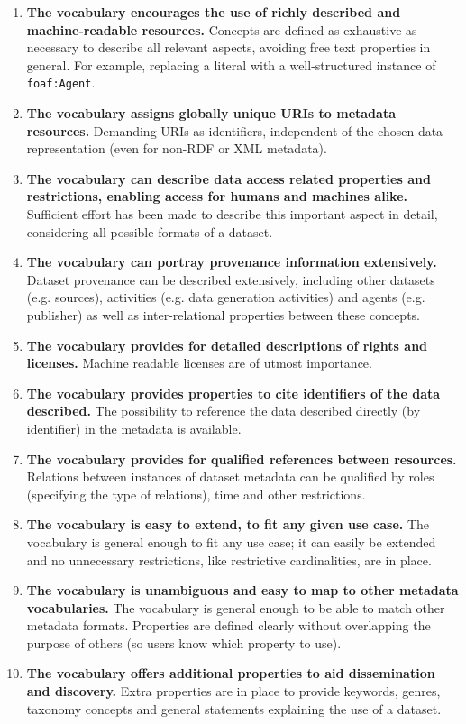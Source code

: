 \documentclass[a4paper,english,twoside,BCOR1.5cm,headsepline,DIV12,appendixprefix,final,12pt]{scrbook}
\newcommand{\prop}[1]{{{\texttt{#1}}}}
\begin{document}
\begin{enumerate}[A]
\item \textbf{The vocabulary encourages the use of richly described and machine-readable resources.} 
Concepts are defined as exhaustive as necessary to describe all relevant aspects, avoiding free text properties in general. For example, replacing a literal with a well-structured instance of \prop{foaf:Agent}. 
\item \textbf{The vocabulary assigns globally unique URIs to metadata resources.} Demanding URIs as identifiers, independent of the chosen data representation (even for non-RDF or XML metadata).
\item \textbf{The vocabulary can describe data access related properties and restrictions, enabling access for humans and machines alike.} Sufficient effort has been made to describe this important aspect in detail, considering all possible formats of a dataset.
\item \textbf{The vocabulary can portray provenance information extensively.} Dataset provenance can be described extensively, including other datasets (e.g. sources), activities (e.g. data generation activities) and agents (e.g. publisher) as well as inter-relational properties between these concepts.
\item \textbf{The vocabulary provides for detailed descriptions of rights and licenses.} Machine readable licenses are of utmost importance.
\item \textbf{The vocabulary provides properties to cite identifiers of the data described.} The possibility to reference the data described directly (by identifier) in the metadata is available.
\item \textbf{The vocabulary provides for qualified references between resources.} Relations between instances of dataset metadata can be qualified by roles (specifying the type of relations), time and other restrictions.
\item \textbf{The vocabulary is easy to extend, to fit any given use case.} The vocabulary is general enough to fit any use case; it can easily be extended and no unnecessary restrictions, like restrictive cardinalities, are in place.
\item \textbf{The vocabulary is unambiguous and easy to map to other metadata vocabularies.} The vocabulary is general enough to be able to match other metadata formats. Properties are defined clearly without overlapping the purpose of others (so users know which property to use).
\item \textbf{The vocabulary offers additional properties to aid dissemination and discovery.} Extra properties are in place to provide keywords, genres, taxonomy concepts and general statements explaining the use of a dataset.
\end{enumerate}
\end{document}
